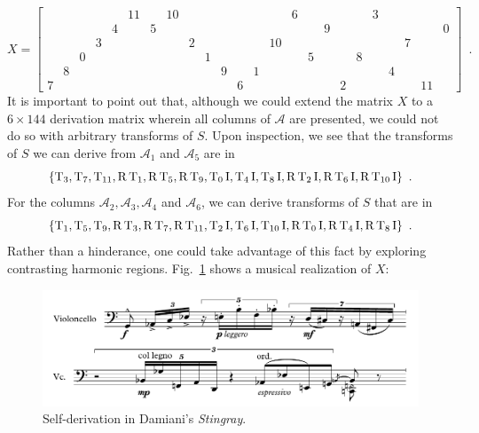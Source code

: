 \begin{example}
    \begin{equation}
        X = \left[
        \begin{array}{cccccccccccc|cccccccccccc}
            &&&&& 11 && 10 &&&&&&& 6 &&&&& 3 &&&& \\
            &&&& 4 && 5 &&&&&&&&&& 9 &&&&&&& 0 \\
            &&& 3 &&&&& 2 &&&&& 10 &&&&&&&& 7 && \\
            && 0 &&&&&&& 1 &&&&&& 5 &&& 8 &&&&& \\
            & 8 &&&&&&&&& 9 && 1 &&&&&&&& 4 &&& \\
            7 &&&&&&&&&&& 6 &&&&&& 2 &&&&& 11 &
        \end{array}
        \right] \enspace.
    \end{equation}
    It is important to point out that, although we could extend the matrix $X$ to a $6 \times 144$ derivation matrix wherein all columns of $\mathcal{A}$ are presented, we could not do so with arbitrary transforms of $S$. Upon inspection, we see that the transforms of $S$ we can derive from $\mathcal{A}_1$ and $\mathcal{A}_5$ are in
    \begin{equation}
        \{ \operatorname{T}_3, \operatorname{T}_7, \operatorname{T}_{11}, \operatorname{R}\operatorname{T}_1, \operatorname{R}\operatorname{T}_5, \operatorname{R}\operatorname{T}_9, \operatorname{T}_0\operatorname{I}, \operatorname{T}_4\operatorname{I}, \operatorname{T}_8\operatorname{I}, \operatorname{R}\operatorname{T}_2\operatorname{I}, \operatorname{R}\operatorname{T}_6\operatorname{I}, \operatorname{R}\operatorname{T}_{10}\operatorname{I} \} \enspace.
    \end{equation}
    For the columns $\mathcal{A}_2, \mathcal{A}_3, \mathcal{A}_4$ and $\mathcal{A}_6$, we can derive transforms of $S$ that are in
    \begin{equation}
        \{ \operatorname{T}_1, \operatorname{T}_5, \operatorname{T}_9, \operatorname{R}\operatorname{T}_3, \operatorname{R}\operatorname{T}_7, \operatorname{R}\operatorname{T}_{11}, \operatorname{T}_2\operatorname{I}, \operatorname{T}_6\operatorname{I}, \operatorname{T}_{10}\operatorname{I}, \operatorname{R}\operatorname{T}_0\operatorname{I}, \operatorname{R}\operatorname{T}_4\operatorname{I}, \operatorname{R}\operatorname{T}_8\operatorname{I} \} \enspace.
    \end{equation}
    Rather than a hinderance, one could take advantage of this fact by exploring contrasting harmonic regions. Fig.~\ref{fig:stingray} shows a musical realization of $X$:
    \begin{figure}[htbp]
        \centering
        \includegraphics[width=6.5in]{figures/stingray-example.pdf}
        \caption[Self-derivation in Damiani's \emph{Stingray}.]{Self-derivation in Damiani's \emph{Stingray}.}
        \label{fig:stingray}
    \end{figure}
\end{example}

